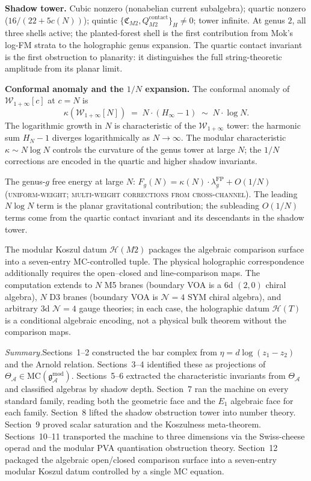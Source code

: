 \documentclass[11pt,reqno]{amsart}
\theoremstyle{definition}
\theoremstyle{remark}
\providecommand{\cA}{\mathcal{A}}
\providecommand{\cH}{\mathcal{H}}
\providecommand{\cN}{\mathcal{N}}
\providecommand{\cW}{\mathcal{W}}
\providecommand{\MC}{\mathrm{MC}}
\providecommand{\gAmod}{\mathfrak{g}^{\mathrm{mod}}_\cA}
\providecommand{\FP}{\mathrm{FP}}
\providecommand{\FP}{\mathrm{FP}}
\providecommand{\contact}{\mathrm{contact}}
\numberwithin{equation}{section}
\begin{document}
\medskip\noindent\textbf{Shadow tower.}\enspace
Cubic nonzero (nonabelian current subalgebra);
quartic nonzero ($16/(22 + 5c(N))$); quintic
$\{\mathfrak C_{M2}, Q^{\contact}_{M2}\}_H \neq 0$; tower
infinite. At genus $2$, all three shells active; the
planted-forest shell is the first contribution from Mok's
log-FM strata to the holographic genus expansion. The quartic
contact invariant is the first obstruction to planarity: it
distinguishes the full string-theoretic amplitude from its
planar limit.

\medskip\noindent\textbf{Conformal anomaly and the $1/N$
expansion.}\enspace
The conformal anomaly of $\cW_{1+\infty}[c]$ at $c = N$ is
\[
\kappa(\cW_{1+\infty}[N])
\;=\;
N \cdot (H_\infty - 1)
\;\sim\;
N \cdot \log N.
\]
The logarithmic growth in $N$ is characteristic of the
$\cW_{1+\infty}$ tower: the harmonic sum $H_N - 1$ diverges
logarithmically as $N \to \infty$. The modular
characteristic $\kappa \sim N \log N$ controls the curvature
of the genus tower at large $N$; the $1/N$ corrections are
encoded in the quartic and higher shadow invariants.

The genus-$g$ free energy at large $N$:
$F_g(N) = \kappa(N) \cdot \lambda_g^{\FP} + O(1/N)$
\textsc{(uniform-weight; multi-weight corrections from
cross-channel)}. The leading $N \log N$ term is the planar
gravitational contribution; the subleading $O(1/N)$ terms
come from the quartic contact invariant and its descendants
in the shadow tower.

The modular Koszul datum $\cH(M2)$ packages the algebraic
comparison surface into a seven-entry MC-controlled tuple. The
physical holographic correspondence additionally requires the
open--closed and line-comparison maps.
The computation extends to $N$ M5 branes (boundary VOA is
a 6d $(2,0)$ chiral algebra), $N$ D3 branes (boundary VOA
is $\cN = 4$ SYM chiral algebra), and arbitrary 3d $\cN = 4$
gauge theories; in each case, the holographic datum $\cH(T)$
is a conditional algebraic encoding, not a physical bulk theorem
without the comparison maps.

\bigskip\noindent\emph{Summary.}\enspace Sections~1--2
constructed the bar complex from $\eta = d\log(z_1 - z_2)$ and
the Arnold relation. Sections~3--4 identified these as
projections of $\Theta_\cA \in \MC(\gAmod)$. Sections~5--6
extracted the characteristic invariants from $\Theta_\cA$ and
classified algebras by shadow depth. Section~7 ran the
machine on every standard family, reading both the geometric
face and the $E_1$ algebraic face for each family. Section~8
lifted the shadow obstruction tower into number theory.
Section~9 proved scalar saturation and the Koszulness
meta-theorem. Sections~10--11 transported the machine to
three dimensions via the Swiss-cheese operad and the modular
PVA quantisation obstruction theory. Section~12 packaged
the algebraic open/closed comparison surface into a seven-entry
modular Koszul datum controlled by a single MC equation.
\end{document}
